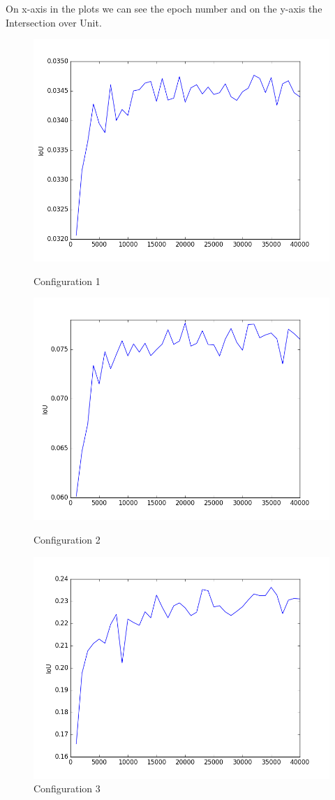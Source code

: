 \documentclass[
fontsize=12pt,
paper=a4,
parskip=false
]{article}
\begin{document}
On x-axis in the plots we can see the epoch number and on the y-axis the Intersection over Unit. 
\begin{figure}[ht] 
	\label{fig7} 
	\begin{minipage}[b]{0.6\textwidth}
		\centering
		\includegraphics[width=.6\textwidth]{config_1} 
		\caption{Configuration 1} 
	\end{minipage}%
	\begin{minipage}[b]{0.6\textwidth}
		\centering
		\includegraphics[width=.6\textwidth]{config_2} 
		\caption{Configuration 2} 
	\end{minipage} 
	\begin{minipage}[b]{0.6\linewidth}
		\centering
		\includegraphics[width=.6\linewidth]{config_3} 
		\caption{Configuration 3} 
	\end{minipage}%

\end{figure}
\end{document}
